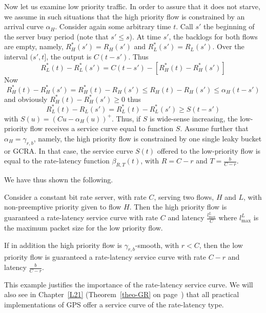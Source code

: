 Now let us examine low priority traffic. In order to assure that
it does not starve, we assume in such situations that the high
priority flow is constrained by an arrival curve $\alpha_H$.
Consider again some arbitrary time $t$. Call $s'$ the beginning of
the server busy period (note that $s' \leq s$). At time $s'$, the
backlogs for both flows are empty, namely, $R_H^*(s')=R_H(s')$ and
$R_L^*(s')=R_L(s')$. Over the interval $(s',t]$, the output is
$C(t-s')$. Thus
 $$R_L^*(t) - R_L^*(s') = C(t-s') - \left[R_H^*(t) -R_H^*(s') \right]
 $$
Now
$$ R_H^*(t) - R_H^*(s') = R_H^*(t) - R_H(s') \leq R_H(t) - R_H(s')
\leq \alpha_H(t-s')
$$
and obviously $R_H^*(t) - R_H^*(s') \geq 0$ thus
$$R_L^*(t) - R_L(s') = R_L^*(t) - R_L^*(s') \geq S(t-s')
$$
with $S(u) = \left(Cu -\alpha_H(u) \right)^+$. Thus, if $S$ is
wide-sense increasing, the low-priority flow receives a service
curve equal to function $S$. Assume further that $\alpha_H =
\gamma_{r,b}$, namely, the high priority flow is constrained by
one single leaky bucket or GCRA. In that case, the service curve
$S(t)$ offered to the low-priority flow is equal to the
rate-latency function $\beta_{R,T}(t)$, with $R=C-r$ and
$T=\frac{b}{C-r}$.

We have thus shown the following.
\begin{proposition}
Consider a constant bit rate server, with rate $C$, serving two
flows, $H$ and $L$, with non-preemptive priority given to flow
$H$. Then the high priority flow is guaranteed a rate-latency
service curve with rate $C$ and latency $\frac{l^L_{\max}}{C}$
where $l^L_{\max}$ is the maximum packet size for the low priority
flow.

If in addition the high priority flow is $\gamma_{r,b}$-smooth,
with $r<C$, then the low priority flow is guaranteed a
rate-latency service curve with rate $C-r$ and latency
$\frac{b}{C-r}$. 
\end{proposition}

This example justifies the importance of the rate-latency service
curve. We will also see in Chapter~\ref{L21}
(Theorem~\ref{theo-GR} on page~\pageref{theo-GR}) that all
practical implementations of GPS offer a service curve of the
rate-latency type.



